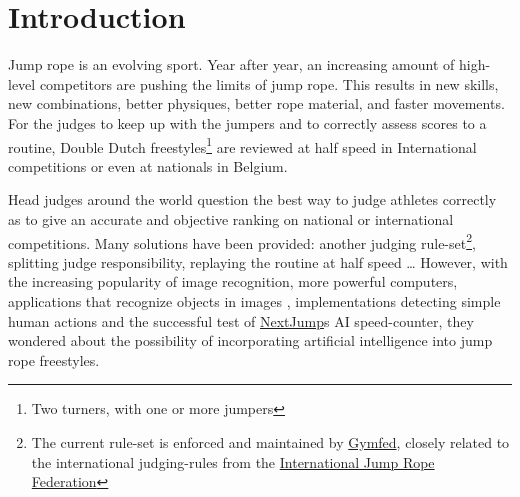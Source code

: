 
\section{Introduction}
\label{sec:introduction}

    
Jump rope is an evolving sport.
Year after year, an increasing amount of high-level competitors are pushing the limits of jump rope.
This results in new skills, new combinations, better physiques, better rope material, and faster movements. For the judges to keep up with the jumpers and to correctly assess scores to a routine, Double Dutch freestyles\footnote{Two turners, with one or more jumpers} are reviewed at half speed in International competitions or even at nationals in Belgium.

Head judges around the world question the best way to judge athletes correctly as to give an accurate and objective ranking on national or international competitions.
Many solutions have been provided: another judging rule-set\footnote{The current rule-set is enforced and maintained by \href{https://www.gymfed.be/}{Gymfed}, closely related to the international judging-rules from the \href{https://ijru.sport/}{International Jump Rope Federation}}, splitting judge responsibility, replaying the routine at half speed \dots
However, with the increasing popularity of image recognition, more powerful computers, applications that recognize objects in images \autocite{Singh_Gill_2022}, implementations detecting simple human actions \autocite{LUQMAN_2022} and the successful test of \href{https://nextjump.app/}{NextJump}s AI speed-counter, they wondered about the possibility of incorporating artificial intelligence into jump rope freestyles.

